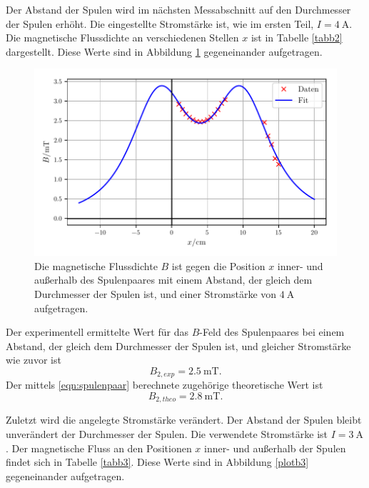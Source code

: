 \noindent Der Abstand der Spulen wird im nächsten Messabschnitt auf den
Durchmesser der Spulen erhöht.
Die eingestellte Stromstärke ist, wie im ersten Teil,
$I = \SI{4}{\ampere}$.
Die magnetische Flussdichte an verschiedenen Stellen $x$ ist
in Tabelle \ref{tabb2} dargestellt.
Diese Werte sind in Abbildung \ref{plotb2} gegeneinander %
aufgetragen.


\begin{figure}
    \centering
    \includegraphics{build/plotb2.pdf}
    \caption{Die magnetische Flussdichte $B$ ist gegen die Position $x$ inner-
    und außerhalb des Spulenpaares mit einem Abstand, der gleich dem Durchmesser
    der Spulen ist, und einer Stromstärke von $\SI{4}{\ampere}$ aufgetragen.}
    \label{plotb2}
\end{figure}

\noindent Der experimentell ermittelte Wert für das $B$-Feld
des Spulenpaares bei einem Abstand, der gleich dem Durchmesser
der Spulen ist, und gleicher Stromstärke wie zuvor ist 
\begin{equation*}
   B_{2,exp} = \SI{2.5}{\milli\tesla}.
\end{equation*}
Der mittels \eqref{eqn:spulenpaar} berechnete zugehörige theoretische Wert
ist 
\begin{equation*}
   B_{2,theo} = \SI{2.8}{\milli\tesla}.
\end{equation*}

\noindent Zuletzt wird die angelegte Stromstärke verändert. Der Abstand
der Spulen bleibt unverändert der Durchmesser der Spulen.
Die verwendete Stromstärke ist $I = \SI{3}{\ampere}$.
Der magnetische Fluss an den Positionen $x$ inner- und außerhalb
der Spulen findet sich in Tabelle \ref{tabb3}.
Diese Werte sind in Abbildung \ref{plotb3} gegeneinander
aufgetragen.


